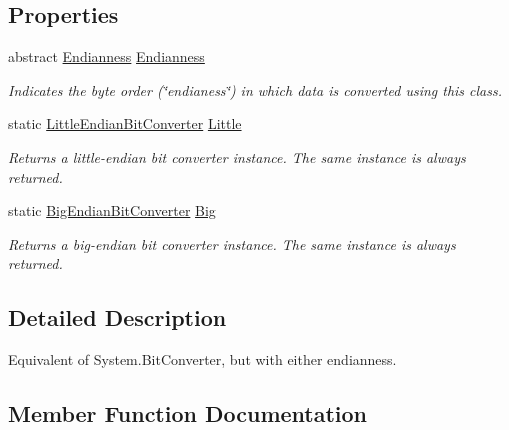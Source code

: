 \subsection*{Properties}
\begin{DoxyCompactItemize}
\item 
abstract \mbox{\hyperlink{namespace_t_net_1_1_i_o_afd413ccca7a2b11b5a201325685881dc}{Endianness}} \mbox{\hyperlink{class_t_net_1_1_i_o_1_1_endian_bit_converter_a71c58efdcbbd22729d8eb1f823cb5479}{Endianness}}
\begin{DoxyCompactList}\small\item\em Indicates the byte order (\char`\"{}endianess\char`\"{}) in which data is converted using this class. \end{DoxyCompactList}\item 
static \mbox{\hyperlink{class_t_net_1_1_i_o_1_1_little_endian_bit_converter}{Little\+Endian\+Bit\+Converter}} \mbox{\hyperlink{class_t_net_1_1_i_o_1_1_endian_bit_converter_a9d8d5d6c2daa5102bc7683e77604f616}{Little}}
\begin{DoxyCompactList}\small\item\em Returns a little-\/endian bit converter instance. The same instance is always returned. \end{DoxyCompactList}\item 
static \mbox{\hyperlink{class_t_net_1_1_i_o_1_1_big_endian_bit_converter}{Big\+Endian\+Bit\+Converter}} \mbox{\hyperlink{class_t_net_1_1_i_o_1_1_endian_bit_converter_af25fbd59f89604f6554e5a5a9ed9a279}{Big}}
\begin{DoxyCompactList}\small\item\em Returns a big-\/endian bit converter instance. The same instance is always returned. \end{DoxyCompactList}\end{DoxyCompactItemize}


\subsection{Detailed Description}
Equivalent of System.\+Bit\+Converter, but with either endianness. 



\subsection{Member Function Documentation}
\mbox{\label{class_t_net_1_1_i_o_1_1_endian_bit_converter_ae6c54f83688fed430b88c2d769f7d693}} 
